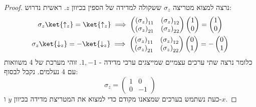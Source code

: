\documentclass{tstextbook}
\begin{document}
\begin{proof}
נרצה למצוא מטריצה \(\sigma_{z}\) ששקולה למדידה של הספין בכיוון \(z\). ראשית נדרוש:
$$\begin{gather}\sigma _{z}\ket{\uparrow_{z}} =\ket{\uparrow_{z}}\implies \begin{pmatrix}\left( \sigma_z \right)_{11} & \left( \sigma_{z} \right)_{12} \\\left( \sigma_{z} \right)_{21} & \left( \sigma_z \right)_{22}\end{pmatrix}\begin{pmatrix}1\\0\end{pmatrix}=\begin{pmatrix}1\\0\end{pmatrix}\\\sigma_{z}\ket{\downarrow_{z}} =-\ket{\downarrow_{z}} \implies   \begin{pmatrix}\left( \sigma_{z} \right)_{11} & \left( \sigma_{z} \right)_{12} \\\left( \sigma_{z} \right)_{21} & \left( \sigma_{z} \right)_{22}\end{pmatrix}\begin{pmatrix}0\\1\end{pmatrix}=-\begin{pmatrix}0\\1\end{pmatrix}
\end{gather}$$
כלומר נרצה שתי ערכים עצמיים שמייצגים ערכי מדידה - \(1,-1\). זוהי מערכת של 4 משוואות עם 4 נעלמים. נקבל לבסוף:
$$\sigma_{z}=\begin{pmatrix}1 & 0 \\0 & -1
\end{pmatrix}$$
כעת נשתמש בערכים שמצאנו מקודם כדי למצוא את המטריצת מדידה בכיוון \(y\) ו-\(x\).

\end{proof}
\end{document}
